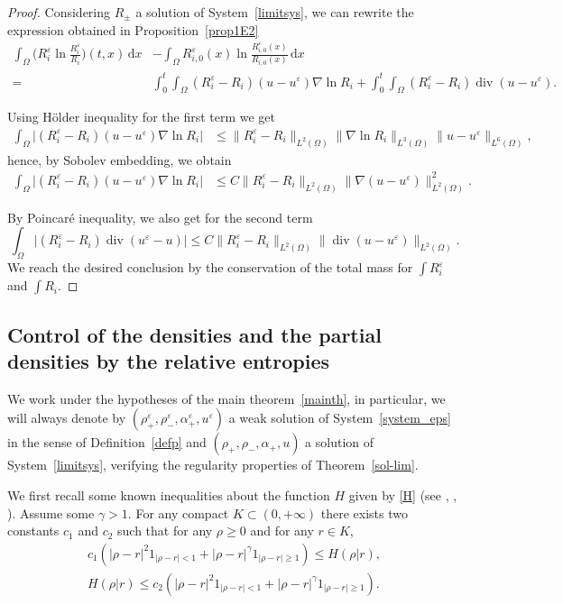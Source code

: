 \documentclass[11pt, twoside, a4paper]{article}
\theoremstyle{plain}
\theoremstyle{remark}
\numberwithin{equation}{section}
\newcommand{\dd}{\,\mathrm{d}}
\renewcommand{\div}{\operatorname{div}}
\renewcommand{\leq}{\leqslant}\renewcommand{\le}{\leqslant}
\renewcommand{\geq}{\geqslant}\renewcommand{\ge}{\geqslant}
\renewcommand{\epsilon}{\varepsilon}
\newcommand{\eps}{\varepsilon}
\begin{document}
\begin{proof}
Considering $R_\pm$ a solution of System~\eqref{limitsys}, we can rewrite the expression obtained in Proposition~\ref{prop1E2}
\begin{align*}
 \int_\Omega \Big(R_i^\eps \ln \frac{R_i^\eps}{R_i}\Big)(t,x) \dd x &-\int_\Omega R_{i,0}^\eps(x) \ln \frac{R_{i,0}^\eps(x)}{R_{i,0}(x)} \dd x\\
 =& \int_0^t\!\!\! \int_\Omega (R_i^\eps - R_i)(u - u^\eps) \nabla \ln R_i 
 + \int_0^t\!\!\! \int_\Omega (R_i^\eps - R_i) \div (u-u^\eps).
\end{align*}

Using Hölder inequality for the first term we get 
\begin{align*}
 \int_\Omega \lvert (R_i^\eps - R_i)(u - u^\eps) \nabla \ln R_i \rvert &\leq \| R_i^\eps - R_i \|_{L^2(\Omega)} \lVert \nabla \ln R_i \rVert_{L^3(\Omega)} \lVert u-u^\eps \rVert_{L^6(\Omega)},
\end{align*}
hence, by Sobolev embedding, we obtain
\begin{align*}
 \int_\Omega \lvert (R_i^\eps - R_i)(u - u^\eps) \nabla \ln R_i \rvert &\leq C \| R_i^\eps - R_i \|_{L^2(\Omega)} \lVert \nabla ( u-u^\eps) \rVert_{L^2(\Omega)}^2.
\end{align*}


By Poincaré inequality, we also get for the second term
\[
\int_\Omega \lvert (R_i^\eps - R_i) \div (u^\eps - u) \rvert \leq C \| R_i^\eps - R_i \|_{L^2(\Omega)} \| \div(u-u^\eps)\|_{L^2(\Omega)}.
\]
We reach the desired conclusion by the conservation of the total mass for $\int R_i^\eps$ and $\int R_i$.
\end{proof}

\subsection{Control of the densities and the partial densities by the relative entropies}


We work under the hypotheses of the main theorem~\ref{mainth}, in particular, we will always denote by $(\rho^{\epsilon}_+,\rho^{\epsilon}_-,\alpha^{\epsilon}_+,u^{\epsilon})$ a weak solution of System~\eqref{system_eps} in the sense of Definition~\ref{defp} and $(\rho_+,\rho_-,\alpha_+,u)$ a solution of System~\eqref{limitsys}, verifying the regularity properties of Theorem~\ref{sol-lim}.



We first recall some known inequalities about the function $H$ given by \eqref{H} (see \cite{lions1998incompressible}, \cite{feireisl2012relative}, \cite{sueur2014inviscid}). Assume some $\gamma > 1$. For any compact $K \subset (0,+\infty)$ there exists two constants $c_1$ and $c_2$ such that for any $\rho \geq 0$ and for any $r \in K$,
\begin{align*}
 c_1 \left( \lvert \rho - r \rvert^2 1_{\lvert \rho - r\rvert <1} + \lvert \rho - r \rvert^\gamma 1_{\lvert \rho - r\rvert \geq 1} \right) \leq H(\rho | r),\\
 H(\rho | r) \leq c_2 \left( \lvert \rho - r \rvert^2 1_{\lvert \rho - r\rvert <1} + \lvert \rho - r \rvert^\gamma 1_{\lvert \rho - r\rvert \geq 1} \right).
\end{align*}
\end{document}
